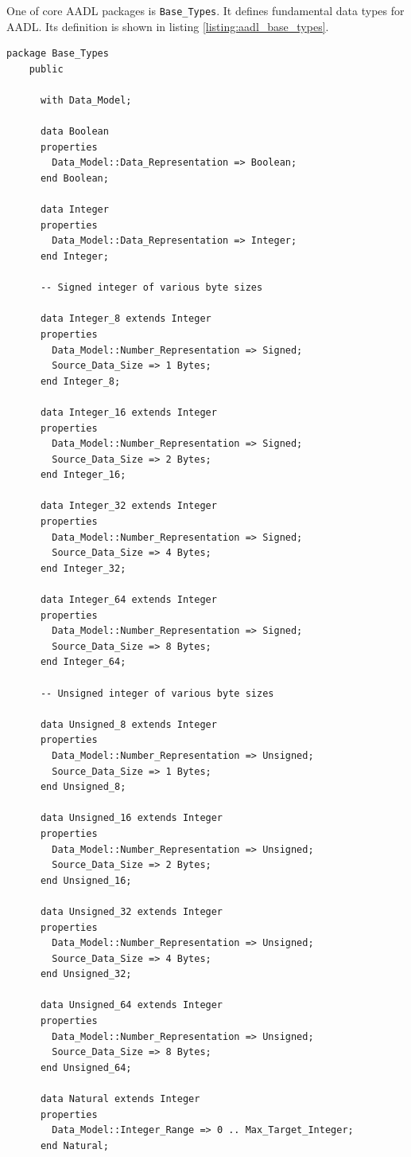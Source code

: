 One of core AADL packages is \lstinline{Base_Types}. It defines fundamental data types for AADL. Its definition is shown in listing \ref{listing:aadl_base_types}.

\singlespacing
\begin{lstlisting}[language=aadl, frame=single, gobble=0, caption={AADL Base\_Types package}, label={listing:aadl_base_types}]
	package Base_Types
	public

	  with Data_Model;

	  data Boolean
	  properties 
	    Data_Model::Data_Representation => Boolean;
	  end Boolean;

	  data Integer
	  properties
	    Data_Model::Data_Representation => Integer;
	  end Integer;

	  -- Signed integer of various byte sizes

	  data Integer_8 extends Integer
	  properties
	    Data_Model::Number_Representation => Signed;
	    Source_Data_Size => 1 Bytes;
	  end Integer_8;

	  data Integer_16 extends Integer
	  properties
	    Data_Model::Number_Representation => Signed;
	    Source_Data_Size => 2 Bytes;
	  end Integer_16;

	  data Integer_32 extends Integer
	  properties
	    Data_Model::Number_Representation => Signed;
	    Source_Data_Size => 4 Bytes;
	  end Integer_32;

	  data Integer_64 extends Integer
	  properties
	    Data_Model::Number_Representation => Signed;
	    Source_Data_Size => 8 Bytes;
	  end Integer_64;

	  -- Unsigned integer of various byte sizes

	  data Unsigned_8 extends Integer
	  properties
	    Data_Model::Number_Representation => Unsigned;
	    Source_Data_Size => 1 Bytes;
	  end Unsigned_8;

	  data Unsigned_16 extends Integer
	  properties
	    Data_Model::Number_Representation => Unsigned;
	    Source_Data_Size => 2 Bytes;
	  end Unsigned_16;

	  data Unsigned_32 extends Integer
	  properties
	    Data_Model::Number_Representation => Unsigned;
	    Source_Data_Size => 4 Bytes;
	  end Unsigned_32;

	  data Unsigned_64 extends Integer
	  properties
	    Data_Model::Number_Representation => Unsigned;
	    Source_Data_Size => 8 Bytes;
	  end Unsigned_64;

	  data Natural extends Integer
	  properties 
	    Data_Model::Integer_Range => 0 .. Max_Target_Integer;
	  end Natural;


\end{lstlisting}
